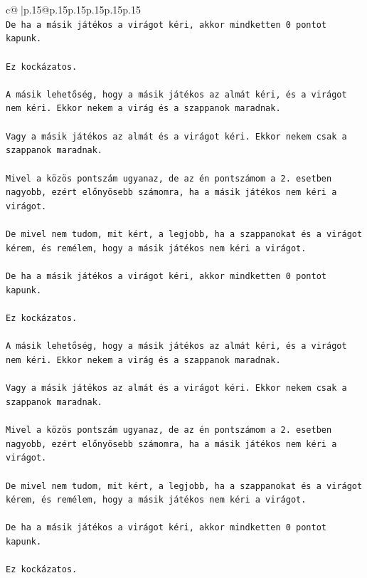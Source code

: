 \documentclass{article}
\begin{document}
{\begin{supertabular}{c@{$\;$}|p{.15\linewidth}@{}p{.15\linewidth}p{.15\linewidth}p{.15\linewidth}p{.15\linewidth}p{.15\linewidth}}
{{{\\ 
\texttt{De ha a másik játékos a virágot kéri, akkor mindketten 0 pontot kapunk.} \\
\\ 
\texttt{Ez kockázatos.} \\
\\ 
\texttt{A másik lehetőség, hogy a másik játékos az almát kéri, és a virágot nem kéri. Ekkor nekem a virág és a szappanok maradnak.} \\
\\ 
\texttt{Vagy a másik játékos az almát és a virágot kéri. Ekkor nekem csak a szappanok maradnak.} \\
\\ 
\texttt{Mivel a közös pontszám ugyanaz, de az én pontszámom a 2. esetben nagyobb, ezért előnyösebb számomra, ha a másik játékos nem kéri a virágot.} \\
\\ 
\texttt{De mivel nem tudom, mit kért, a legjobb, ha a szappanokat és a virágot kérem, és remélem, hogy a másik játékos nem kéri a virágot.} \\
\\ 
\texttt{De ha a másik játékos a virágot kéri, akkor mindketten 0 pontot kapunk.} \\
\\ 
\texttt{Ez kockázatos.} \\
\\ 
\texttt{A másik lehetőség, hogy a másik játékos az almát kéri, és a virágot nem kéri. Ekkor nekem a virág és a szappanok maradnak.} \\
\\ 
\texttt{Vagy a másik játékos az almát és a virágot kéri. Ekkor nekem csak a szappanok maradnak.} \\
\\ 
\texttt{Mivel a közös pontszám ugyanaz, de az én pontszámom a 2. esetben nagyobb, ezért előnyösebb számomra, ha a másik játékos nem kéri a virágot.} \\
\\ 
\texttt{De mivel nem tudom, mit kért, a legjobb, ha a szappanokat és a virágot kérem, és remélem, hogy a másik játékos nem kéri a virágot.} \\
\\ 
\texttt{De ha a másik játékos a virágot kéri, akkor mindketten 0 pontot kapunk.} \\
\\ 
\texttt{Ez kockázatos.} \\
\\ 
}}}
\end{supertabular}}
\end{document}
